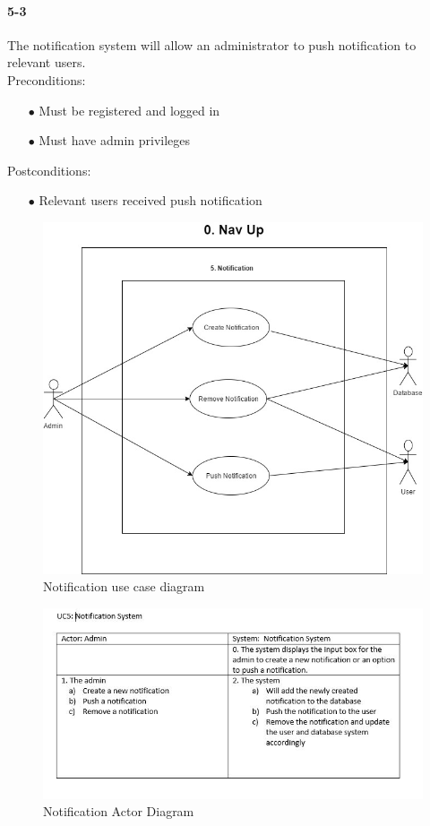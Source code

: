 \documentclass[a4paper,12pt]{article}
\begin{document}
\paragraph{5-3}
The notification system will allow an administrator to push notification to relevant users.\\
Preconditions:
\begin{itemize}
	\item[$\bullet$] Must be registered and logged in
	\item[$\bullet$] Must have admin privileges
\end{itemize}
Postconditions:
\begin{itemize}
	\item[$\bullet$] Relevant users received push notification
\end{itemize}
\begin{figure}[H]
\includegraphics[width=\textwidth]{UseCaseDiagrams/NotificationUCD.JPG}
\caption{Notification use case diagram}
\label{fig:Notification Use Case Diagram}
\end{figure}
\begin{figure}[H]
\includegraphics[width=\textwidth]{ActorDiagrams/NotificationAD.JPG}
\caption{Notification Actor Diagram}
\label{fig:Notification Actor Diagram}
\end{figure}
\end{document}
